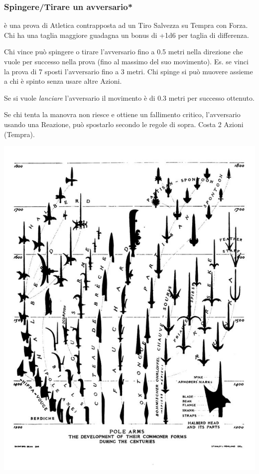 \begin{multicols}{2}
\subsubsection{Spingere/Tirare un avversario*} \label{spingereavversario}\hypertarget{spingereavversario}{}

è una prova di Atletica contrapposta ad un Tiro Salvezza su Tempra con Forza. Chi ha una taglia maggiore guadagna un bonus di +1d6 per taglia di differenza.

Chi vince può spingere o tirare l'avversario fino a 0.5 metri nella direzione che vuole per successo nella prova (fino al massimo del suo movimento). Es. se vinci la prova di 7 sposti l'avversario fino a 3 metri. Chi spinge si può muovere assieme a chi è spinto senza usare altre Azioni.

Se si vuole \emph{lanciare} l'avversario il movimento è di 0.3 metri per successo ottenuto.

Se chi tenta la manovra non riesce e ottiene un fallimento critico, l'avversario usando una Reazione, può spostarlo secondo le regole di sopra. Costa 2 Azioni (Tempra).

\begin{center}
	\includegraphics[width=0.95\linewidth]{immagini/fauchard.png}


\end{center}
\end{multicols}
